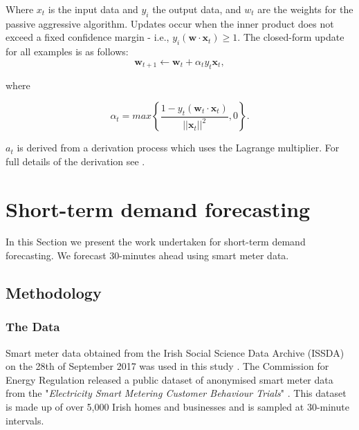 \noindent Where $x_t$ is the input data and $y_i$ the output data, and $w_t$ are the weights for the passive aggressive algorithm. Updates occur when the inner product does not exceed a fixed confidence margin - i.e., $y_i(\boldsymbol{w}\cdot \boldsymbol{x}_t)\geq1$. The closed-form update for all examples is as follows:
\begin{equation}
\boldsymbol{w}_{t+1}\leftarrow \boldsymbol{w}_{t} + \alpha_t y_t \boldsymbol{x}_t,
\end{equation}

\noindent where 

\begin{equation}
\alpha_t=max\left\{\frac{1-y_t(\boldsymbol{w}_t\cdot\boldsymbol{x}_t)}{\left|\left|\boldsymbol{x}_t\right|\right|^2},0\right\}. 	
\end{equation}

\noindent $a_t$ is derived from a derivation process which uses the Lagrange multiplier. For full details of the derivation see \cite{Gzik2014}.














\section{Short-term demand forecasting}
\label{forecast:sec:shortterm}


In this Section we present the work undertaken for short-term demand forecasting. We forecast 30-minutes ahead using smart meter data. 

\subsection{Methodology}
\subsubsection{The Data}


Smart meter data obtained from the Irish Social Science Data Archive (ISSDA) on the 28th of September 2017 was used in this study \cite{cer_2012}. The Commission for Energy Regulation released a public dataset of anonymised smart meter data from the "\textit{Electricity Smart Metering Customer Behaviour Trials}" \cite{cer_2012}. This dataset is made up of over 5,000 Irish homes and businesses and is sampled at 30-minute intervals.

